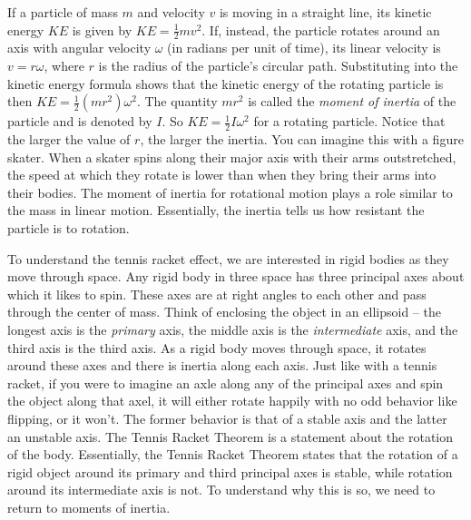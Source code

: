 	 \ea
	 
\ee

\label{sec:proj_tennis}

If a particle of mass $m$ and velocity $v$ is moving in a straight line, its kinetic energy $KE$ is given by $KE = \frac{1}{2}mv^2$. If, instead, the particle rotates around an axis with angular velocity $\omega$ (in radians per unit of time), its linear velocity is $v = r \omega$, where $r$ is the radius of the particle's circular path. Substituting into the kinetic energy formula shows that the kinetic energy of the rotating particle is then $KE = \frac{1}{2}\left(mr^2\right) \omega^2$. The quantity $mr^2$ is called the \emph{moment of inertia} of the particle and is denoted by $I$. So $KE = \frac{1}{2}I\omega^2$ for a rotating particle. Notice that the larger the value of $r$, the larger the inertia. You can imagine this with a figure skater. When a skater spins along their major axis with their arms outstretched, the speed at which they rotate is lower than when they bring their arms into their bodies. The moment of inertia for rotational motion plays a role similar to the mass in linear motion. Essentially, the inertia tells us how resistant the particle is to rotation. 

To understand the tennis racket effect, we are interested in rigid bodies as they move through space. Any rigid body in three space has three principal axes about which it likes to spin. These axes are at right angles to each other and pass through the center of mass. Think of enclosing the object in an ellipsoid -- the longest axis is the \emph{primary} axis, the middle axis is the \emph{intermediate} axis, and the third axis is the third axis. As a rigid body moves through space, it rotates around these axes and there is inertia along each axis. Just like with a tennis racket, if you were to imagine an axle along any of the principal axes and spin the object along that axel, it will either rotate happily with no odd behavior like flipping, or it won't. The former behavior is that of a stable axis and the latter an unstable axis. The Tennis Racket Theorem is a statement about the rotation of the body. Essentially, the Tennis Racket Theorem states that the rotation of a rigid object around its primary and third principal axes is stable, while rotation around its intermediate axis is not. To understand why this is so, we need to return to moments of inertia. 


